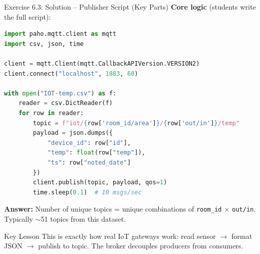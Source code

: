 \documentclass[aspectratio=169,11pt]{beamer}
\begin{document}
\begin{frame}[fragile]{Exercise 6.3: Solution -- Publisher Script (Key Parts)}
    \textbf{Core logic} (students write the full script):

    \vspace{0.1cm}
\begin{lstlisting}[language=Python]
import paho.mqtt.client as mqtt
import csv, json, time

client = mqtt.Client(mqtt.CallbackAPIVersion.VERSION2)
client.connect("localhost", 1883, 60)

with open("IOT-temp.csv") as f:
    reader = csv.DictReader(f)
    for row in reader:
        topic = f"iot/{row['room_id/area']}/{row['out/in']}/temp"
        payload = json.dumps({
            "device_id": row["id"],
            "temp": float(row["temp"]),
            "ts": row["noted_date"]
        })
        client.publish(topic, payload, qos=1)
        time.sleep(0.1)  # 10 msgs/sec
\end{lstlisting}

    \vspace{0.1cm}
    \textbf{Answer:} Number of unique topics = unique combinations of \texttt{room\_id} $\times$ \texttt{out/in}. Typically $\sim$51 topics from this dataset.

    \begin{exampleblock}{Key Lesson}
        This is exactly how real IoT gateways work: read sensor $\rightarrow$ format JSON $\rightarrow$ publish to topic. The broker decouples producers from consumers.
    \end{exampleblock}
\end{frame}
\end{document}
